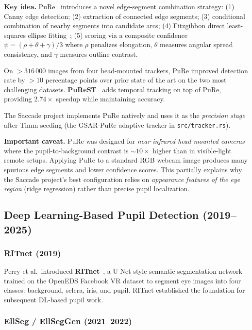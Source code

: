 \documentclass[11pt,a4paper]{article}
\begin{document}
\textbf{Key idea.} PuRe~\cite{santini2018pure} introduces a novel edge-segment combination strategy:
(1) Canny edge detection;
(2) extraction of connected edge segments;
(3) conditional combination of nearby segments into candidate arcs;
(4) Fitzgibbon direct least-squares ellipse fitting~\cite{fitzgibbon1999direct};
(5) scoring via a composite confidence $\psi = (\rho + \theta + \gamma)/3$ where $\rho$ penalizes elongation, $\theta$ measures angular spread consistency, and $\gamma$ measures outline contrast.

On $>316\,000$ images from four head-mounted trackers, PuRe improved detection rate by $>10$ percentage points over prior state of the art on the two most challenging datasets.
\textbf{PuReST}~\cite{santini2018purest} adds temporal tracking on top of PuRe, providing $2.74\times$ speedup while maintaining accuracy.

The Saccade project implements PuRe natively and uses it as the \textit{precision stage} after Timm seeding (the GSAR-PuRe adaptive tracker in \texttt{src/tracker.rs}).

\textbf{Important caveat.} PuRe was designed for \textit{near-infrared head-mounted cameras} where the pupil-to-background contrast is $\sim10\times$ higher than in visible-light remote setups.
Applying PuRe to a standard RGB webcam image produces many spurious edge segments and lower confidence scores.
This partially explains why the Saccade project's best configuration relies on \textit{appearance features of the eye region} (ridge regression) rather than precise pupil localization.

\subsection{Deep Learning-Based Pupil Detection (2019--2025)}

\subsubsection{RITnet (2019)}

Perry et al.\ introduced \textbf{RITnet}~\cite{ritnet2019}, a U-Net-style semantic segmentation network trained on the OpenEDS Facebook VR dataset to segment eye images into four classes: background, sclera, iris, and pupil.
RITnet established the foundation for subsequent DL-based pupil work.

\subsubsection{EllSeg / EllSegGen (2021--2022)}
\end{document}

